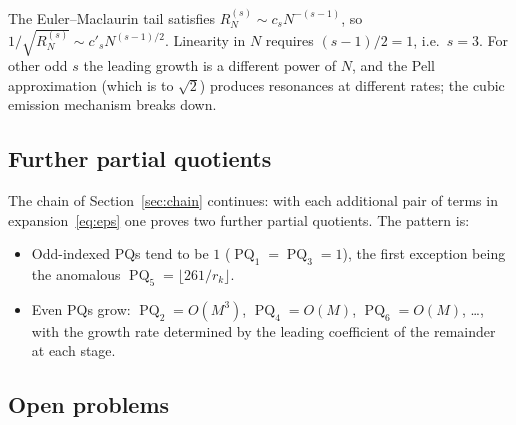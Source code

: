 \documentclass[10pt,a4paper]{amsart}
\newcommand{\floor}[1]{\lfloor #1 \rfloor}
\DeclareMathOperator{\PQ}{PQ}
\begin{document}
The Euler--Maclaurin tail satisfies $R_N^{(s)} \sim c_s N^{-(s-1)}$,
so $1/\sqrt{R_N^{(s)}} \sim c'_s N^{(s-1)/2}$.  Linearity in $N$
requires $(s-1)/2 = 1$, i.e.\ $s = 3$.  For other odd $s$ the leading
growth is a different power of $N$, and the Pell approximation (which
is to $\sqrt{2}$) produces resonances at different rates; the cubic
emission mechanism breaks down.

\subsection{Further partial quotients}

The chain of Section~\ref{sec:chain} continues: with each additional
pair of terms in expansion~\eqref{eq:eps} one proves two further partial
quotients.  The pattern is:
\begin{itemize}
  \item Odd-indexed PQs tend to be $1$ ($\PQ_1 = \PQ_3 = 1$), the first
    exception being the anomalous $\PQ_5 = \floor{261/r_k}$.
  \item Even PQs grow: $\PQ_2 = O(M^3)$, $\PQ_4 = O(M)$, $\PQ_6 = O(M)$, \ldots,
    with the growth rate determined by the leading coefficient of the
    remainder at each stage.
\end{itemize}

\subsection{Open problems}
\end{document}
